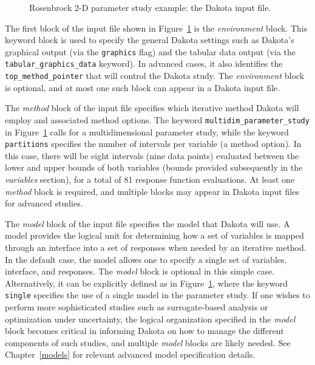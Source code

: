 \begin{figure}[ht!]
  \centering
  \begin{bigbox}
    \begin{small}
    \end{small}
  \end{bigbox}
  \caption{Rosenbrock 2-D parameter study example: the Dakota input
    file.}
  \label{tutorial:rosenbrock_multidim}
\end{figure}

The first block of the input file shown in
Figure~\ref{tutorial:rosenbrock_multidim} is the \emph{environment}
block.  This keyword block is used to specify the general Dakota
settings such as Dakota's graphical output (via the \texttt{graphics}
flag) and the tabular data output (via the
\texttt{tabular\_graphics\_data} keyword).  In advanced cases, it also
identifies the \texttt{top\_method\_pointer} that will control the
Dakota study.  The \emph{environment} block is optional, and at most
one such block can appear in a Dakota input file.

The \emph{method} block of the input file specifies which iterative
method Dakota will employ and associated method options.
The keyword \texttt{multidim\_parameter\_study} in
Figure~\ref{tutorial:rosenbrock_multidim} calls for a multidimensional
parameter study, while the keyword \texttt{partitions} specifies the
number of intervals per variable (a method option). In this case,
there will be eight intervals (nine data points) evaluated between the
lower and upper bounds of both variables (bounds provided subsequently
in the \emph{variables} section), for a total of 81 response function
evaluations.  At least one \emph{method} block is required, and
multiple blocks may appear in Dakota input files for advanced studies.

The \emph{model} block of the input file specifies the model that
Dakota will use. A model provides the logical unit for determining how
a set of variables is mapped through an interface into a set of
responses when needed by an iterative method. In the default case, the
model allows one to specify a single set of variables, interface, and
responses.  The \emph{model} block is optional in this simple case.
Alternatively, it can be explicitly defined as in
Figure~\ref{tutorial:rosenbrock_multidim}, where the keyword
\texttt{single} specifies the use of a single model in the parameter
study.  If one wishes to perform more sophisticated studies such as
surrogate-based analysis or optimization under uncertainty, the
logical organization specified in the \emph{model} block becomes
critical in informing Dakota on how to manage the different components
of such studies, and multiple \emph{model} blocks are likely needed.
See Chapter~\ref{models} for relevant advanced model specification
details.

